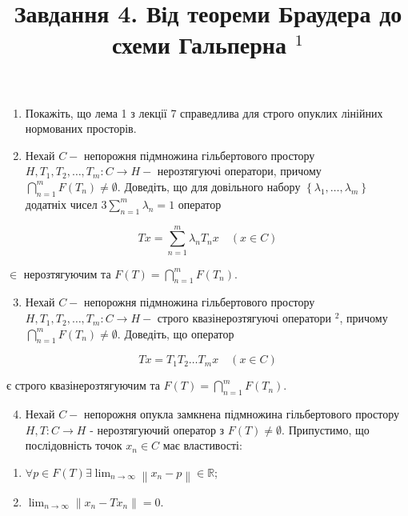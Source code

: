 \documentclass[10pt]{article}
\title{Завдання 4. Від теореми Браудера до схеми Гальперна ${ }^{1}$ }
\author{}
\date{}
\begin{document}
\maketitle
\begin{enumerate}
  \item Покажіть, що лема 1 з лекції 7 справедлива для строго опуклих лінійних нормованих просторів.

  \item Нехай $C-$ непорожня підмножина гільбертового простору $H, T_{1}, T_{2}, \ldots, T_{m}: C \rightarrow H-$ нерозтягуючі оператори, причому $\bigcap_{n=1}^{m} F\left(T_{n}\right) \neq \emptyset$. Доведіть, що для довільного набору $\left\{\lambda_{1}, \ldots, \lambda_{m}\right\}$ додатніх чисел $3 \sum_{n=1}^{m} \lambda_{n}=1$ оператор

\end{enumerate}

$$
T x=\sum_{n=1}^{m} \lambda_{n} T_{n} x \quad(x \in C)
$$

$\in$ нерозтягуючим та $F(T)=\bigcap_{n=1}^{m} F\left(T_{n}\right)$.

\begin{enumerate}
  \setcounter{enumi}{2}
  \item Нехай $C-$ непорожня підмножина гільбертового простору $H, T_{1}, T_{2}, \ldots, T_{m}: C \rightarrow H-$ строго квазінерозтягуючі оператори ${ }^{2}$, причому $\bigcap_{n=1}^{m} F\left(T_{n}\right) \neq \emptyset$. Доведіть, що оператор
\end{enumerate}

$$
T x=T_{1} T_{2} \ldots T_{m} x \quad(x \in C)
$$

є строго квазінерозтягуючим та $F(T)=\bigcap_{n=1}^{m} F\left(T_{n}\right)$.

\begin{enumerate}
  \setcounter{enumi}{3}
  \item Нехай $C-$ непорожня опукла замкнена підмножина гільбертового простору $H, T: C \rightarrow H$ - нерозтягуючий оператор з $F(T) \neq \emptyset$. Припустимо, що послідовність точок $x_{n} \in C$ має властивості:
\end{enumerate}

\begin{enumerate}
  \item $\forall p \in F(T) \exists \lim _{n \rightarrow \infty}\left\|x_{n}-p\right\| \in \mathbb{R}$;

  \item $\lim _{n \rightarrow \infty}\left\|x_{n}-T x_{n}\right\|=0$.

\end{enumerate}
\end{document}
